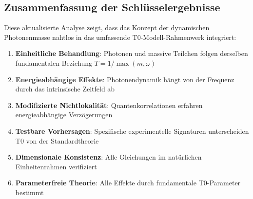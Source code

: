 \documentclass[12pt,a4paper]{article}
\begin{document}
	\subsection{Zusammenfassung der Schlüsselergebnisse}
	
	Diese aktualisierte Analyse zeigt, dass das Konzept der dynamischen Photonenmasse nahtlos in das umfassende T0-Modell-Rahmenwerk integriert:
	
	\begin{enumerate}
		\item \textbf{Einheitliche Behandlung}: Photonen und massive Teilchen folgen derselben fundamentalen Beziehung $T = 1/\max(m,\omega)$
		\item \textbf{Energieabhängige Effekte}: Photonendynamik hängt von der Frequenz durch das intrinsische Zeitfeld ab
		\item \textbf{Modifizierte Nichtlokalität}: Quantenkorrelationen erfahren energieabhängige Verzögerungen
		\item \textbf{Testbare Vorhersagen}: Spezifische experimentelle Signaturen unterscheiden T0 von der Standardtheorie
		\item \textbf{Dimensionale Konsistenz}: Alle Gleichungen im natürlichen Einheitenrahmen verifiziert
		\item \textbf{Parameterfreie Theorie}: Alle Effekte durch fundamentale T0-Parameter bestimmt
	\end{enumerate}
	
\end{document}
